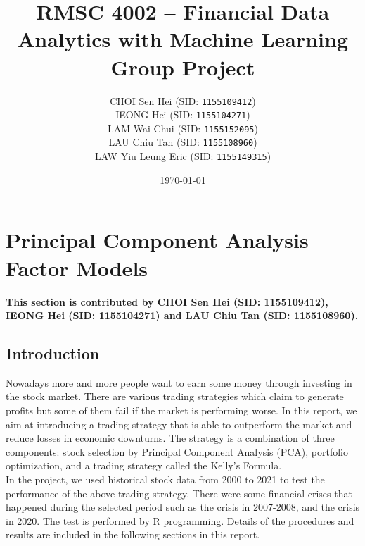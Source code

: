 \documentclass[11pt,a4paper]{article}
\begin{document}
    \thispagestyle{empty}
    \title{\textsc{RMSC 4002} -- Financial Data Analytics with Machine Learning \\ Group Project}
    \author{
        CHOI Sen Hei (SID: \texttt{1155109412}) \\
        IEONG Hei (SID: \texttt{1155104271}) \\
        LAM Wai Chui (SID: \texttt{1155152095}) \\
        LAU Chiu Tan (SID: \texttt{1155108960}) \\
        LAW Yiu Leung Eric (SID: \texttt{1155149315})
    }
    \date{\today}
    \maketitle
    
    \tableofcontents
    \newpage
    
    
    \setcounter{page}{1}
    
    \section{Principal Component Analysis Factor Models}
    \textbf{This section is contributed by CHOI Sen Hei (SID: 1155109412), IEONG Hei (SID: 1155104271) and LAU Chiu Tan (SID: 1155108960).}
    
    \subsection{Introduction}
    Nowadays more and more people want to earn some money through investing in the stock market. There are various trading strategies which claim to generate profits but some of them fail if the market is performing worse. In this report, we aim at introducing a trading strategy that is able to outperform the market and reduce losses in economic downturns. The strategy is a combination of three components: stock selection by Principal Component Analysis (PCA), portfolio optimization, and a trading strategy called the Kelly's Formula. \\
    In the project, we used historical stock data from 2000 to 2021 to test the performance of the above trading strategy. There were some financial crises that happened during the selected period such as the crisis in 2007-2008, and the crisis in 2020. The test is performed by R programming. Details of the procedures and results are included in the following sections in this report.
    
\end{document}
